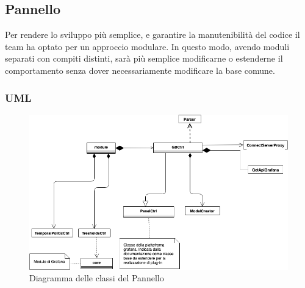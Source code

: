  \subsection{Pannello}\label{archPannello}
Per rendere lo sviluppo più semplice, e garantire la manutenibilità del codice il team ha optato per un approccio modulare. In questo modo, avendo moduli separati con compiti distinti, sarà più semplice modificarne o estenderne il comportamento senza dover necessariamente modificare la base comune.\\


\subsubsection{UML}
\begin{figure}[H]
	\includegraphics[width=\textwidth]{./images/plugin_non_espanso.png}
	\caption{Diagramma delle classi del Pannello}
\end{figure}

